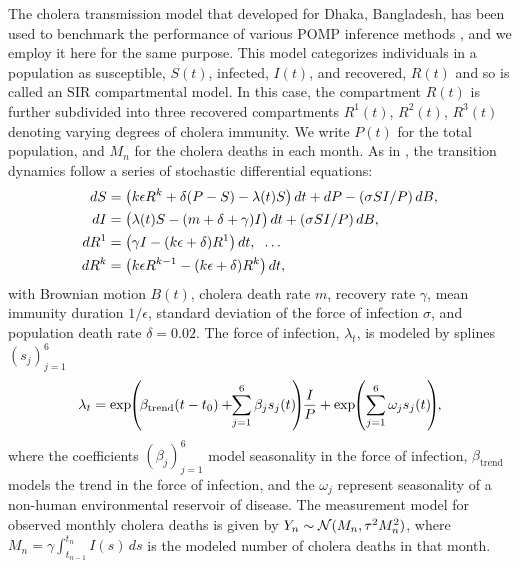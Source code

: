 \documentclass[9pt,twocolumn,pnasresearcharticle]{pnas-new}
\begin{document}
The cholera transmission model that \cite{king08} developed for Dhaka, Bangladesh, has been used to benchmark the performance of various POMP inference methods \cite{ionides15, fasiolo16, wycoff24}, and we employ it here for the same purpose.
This model categorizes individuals in a population as susceptible, $S(t)$, infected, $I(t)$, and recovered, $R(t)$ and so is called an SIR compartmental model.
In this case, the compartment $R(t)$ is further subdivided into 
three recovered compartments $R^1(t)$, $R^2(t)$, $R^3(t)$ denoting varying degrees of cholera immunity.
We write $P(t)$ for the total population, and $M_n$ for the cholera deaths in each month.
As in \cite{king08, ionides15}, the transition dynamics follow a series of stochastic differential equations:
\vspace*{-1mm}
\begin{align*}
    dS&=\big(k \epsilon R^k+\delta(P-S)-\lambda(t) S\big)\, dt+d P-({\sigma S I}/{P})\, dB, \\
    dI&=\big(\lambda(t) S-(m+\delta+\gamma) I\big)\, dt+({\sigma S I}/{P})\, dB, \\
    dR^1&=\big(\gamma I-(k \epsilon+\delta) R^1\big)\, dt, \hspace{2mm} \dots \\
    dR^k&=\big(k \epsilon R^{k-1} -(k \epsilon+\delta) R^k\big)\, dt,
    \vspace*{-2mm}
\end{align*}
with Brownian motion $B(t)$, cholera death rate $m$, recovery rate $\gamma$, mean immunity duration $1/\epsilon$, standard deviation of the force of infection $\sigma$, and population death rate $\delta=0.02$. The force of infection, $\lambda_t$, is modeled by splines $(s_j)_{j=1}^6$
\vspace*{-2mm}
\begin{equation*}    \lambda_t=\exp\hspace{-1mm}\left(\hspace{-.5mm}\beta_{\text{trend}}(t-t_0)+\hspace{-1mm}\sum_{j=1}^{6} \beta_j s_j(t)\hspace{-1mm}\right)\hspace{-1mm}\frac{I}{P} + \exp\hspace{-1mm} \left(\sum_{j=1}^{6} \omega_j s_j(t)\hspace{-1mm}\right)\hspace{-1mm},
    \vspace*{-2mm}
\end{equation*}
where the coefficients $(\beta_j)_{j=1}^6$ model seasonality in the force of infection, $\beta_{\text{trend}}$ models the trend in the force of infection, and the $\omega_j$ represent seasonality of a non-human environmental reservoir of disease.
The measurement model for observed monthly cholera deaths is given by 
    $Y_n \sim {\mathcal{N}}(M_n, \tau^2M_n^2)$,
where $M_n=\gamma\int_{t_{n-1}}^{t_n}I(s)\, ds$ is the modeled number of cholera deaths in that month.
\end{document}
